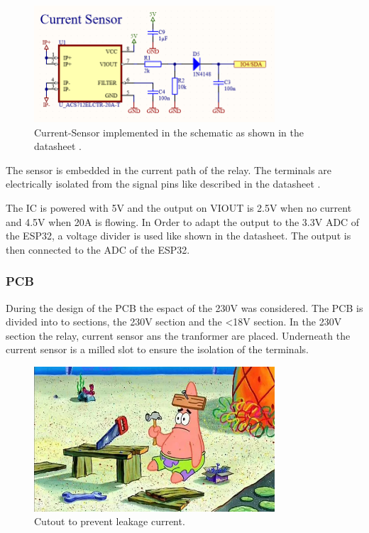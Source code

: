         \begin{figure}[H]
            \centering
            \includegraphics[width=0.8\textwidth]{assets/HW/Current-Sensor-schematic.png}
            \caption{Current-Sensor implemented in the schematic as shown in the datasheet \cite{noauthor_acs712_2024}.}
        \end{figure}

        The sensor is embedded in the current path of the relay. The terminals are 
        electrically isolated from the signal pins like described in the datasheet \cite{noauthor_acs712_2024}. 

        The IC is powered with 5V and the output on VIOUT is 2.5V when no current and 4.5V when 
        20A is flowing. In Order to adapt the output to the 3.3V ADC of the ESP32, a voltage divider
        is used like shown in the datasheet. The output is then connected to the ADC of the ESP32.

        \subsubsection{PCB}

        During the design of the PCB the espact of the 230V was considered. The PCB is divided
        into to sections, the 230V section and the <18V section. In the 230V section the relay, 
        current sensor ans the tranformer are placed. 
        Underneath the current sensor is a milled slot to ensure the isolation of the terminals. 
        
        \begin{figure}[H]
            \centering
            \includegraphics[width=0.8\textwidth]{assets/HW/TBD.png}
            \caption{Cutout to prevent leakage current.}
        \end{figure}

